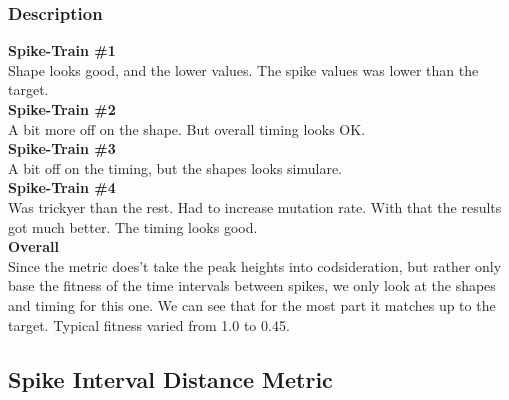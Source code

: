 \subsubsection{Description}

\textbf{Spike-Train \#1} \\
Shape looks good, and the lower values. The spike values was lower than the target.   \\

\textbf{Spike-Train \#2} \\
A bit more off on the shape. But overall timing looks OK.  \\

\textbf{Spike-Train \#3} \\
A bit off on the timing, but the shapes looks simulare.  \\

\textbf{Spike-Train \#4} \\
Was trickyer than the rest. Had to increase mutation rate. With that the results got much better. The timing looks good.  \\

\textbf{Overall} \\
Since the metric does't take the peak heights into codsideration, but rather only base the fitness of the time intervals between spikes, we only look at the shapes and timing for this
one. We can see that for the most part it matches up to the target. Typical fitness varied from 1.0 to 0.45. 





\subsection{Spike Interval Distance Metric}

